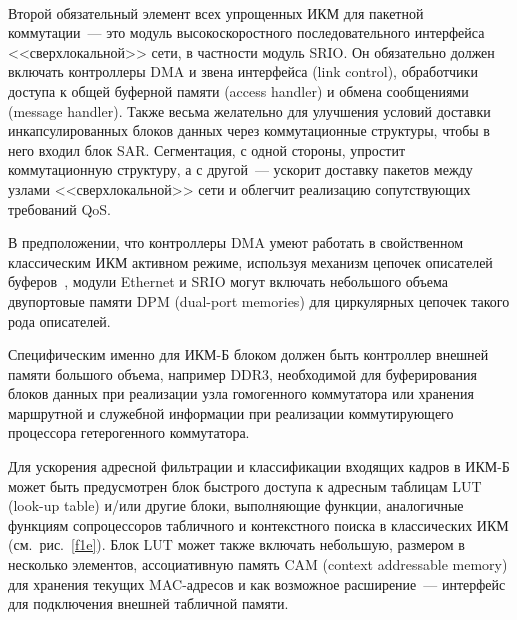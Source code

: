 \begin{multicols}{2}
\begin{figure*} %
\vspace*{1pt}
\begin{center}
\mbox{%
\epsfxsize=141.78mm
}
\end{center}
\vspace*{-9pt}
\end{figure*}
     
     Второй обязательный элемент всех упрощенных ИКМ для пакетной коммутации~--- 
это модуль высокоскоростного последовательного интерфейса <<сверхлокальной>> сети, в 
частности модуль SRIO. Он обязательно должен включать контроллеры DMA и звена 
интерфейса (link control), обработчики доступа к общей буферной памяти (access handler) и 
обмена сообщениями (message handler). Также весьма желательно для улучшения условий 
доставки инкапсулированных блоков данных через коммутационные структуры, чтобы в 
него входил блок SAR. Сегментация, с одной стороны, упростит коммутационную 
структуру, а с другой~--- ускорит доставку пакетов между узлами <<сверхлокальной>> сети 
и облегчит реализацию сопутствующих требований QoS.

     
     В предположении, что контроллеры DMA умеют работать в свойственном 
классическим ИКМ активном режиме, используя механизм цепочек описателей 
буферов~\cite{8e}, модули Ethernet и SRIO могут включать небольшого объема двупортовые 
памяти DPM (dual-port memories) для циркулярных цепочек такого рода описателей.
     
     Специфическим именно для ИКМ-Б блоком должен быть контроллер внешней памяти 
большого объема, например DDR3, необходимой для буферирования блоков данных при 
реализации узла гомогенного коммутатора или хранения маршрутной и служебной 
информации при реализации коммутирующего процессора гетерогенного коммутатора.
     
     Для ускорения адресной фильтрации и классификации входящих кадров в ИКМ-Б 
может быть предусмотрен блок быстрого доступа к адресным таблицам LUT (look-up table) 
и/или другие блоки, выполняющие функции, аналогичные функциям сопроцессоров 
табличного и контекстного поиска в классических ИКМ (см.\ рис.~\ref{f1e}). Блок LUT 
может также включать небольшую, размером в несколько элементов, ассоциативную память 
CAM (context addressable memory) для хранения текущих MAC-ад\-ре\-сов и как возможное 
расширение~--- интерфейс для подключения внешней табличной памяти.
     

\begin{table*}\small
\begin{center}
\vspace*{2ex}


\end{center}
\end{table*}
\end{multicols}
